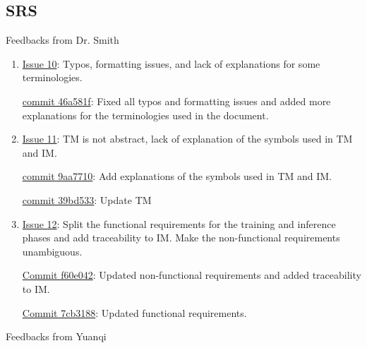 \documentclass{article}
\begin{document}
\subsection{SRS}
Feedbacks from Dr. Smith
\begin{enumerate}
    \item \href{https://github.com/V-AS/Two-tower-recommender-system/issues/10}{Issue 10}: Typos, formatting issues, and lack of explanations for some terminologies.  
    
    \href{https://github.com/V-AS/Two-tower-recommender-system/commit/46a581ffec8f09107f233065023d5e09764f8eb1}{commit 46a581f}: Fixed all typos and formatting issues and added more explanations for the terminologies used in the document. 
    
    \item \href{https://github.com/V-AS/Two-tower-recommender-system/issues/11}{Issue 11}: TM is not abstract, lack of explanation of the symbols used in TM and IM.
    
    \href{https://github.com/V-AS/Two-tower-recommender-system/commit/9aa7710e560448bddbc17a60377ccdd5e0e5989a}{commit 9aa7710}: Add explanations of the symbols used in TM and IM.

    \href{https://github.com/V-AS/Two-tower-recommender-system/commit/39bd533753ef0951fa4a5d411c8ae693e7f99ee7}{commit 39bd533}: Update TM 

    \item \href{https://github.com/V-AS/Two-tower-recommender-system/issues/12}{Issue 12}: Split the functional requirements for the training and inference phases and add traceability to IM.  
    Make the non-functional requirements unambiguous.  

    \href{https://github.com/V-AS/Two-tower-recommender-system/commit/f60e04293c87e0ce356bcfcb75288305ada5343f}{Commit f60e042}: Updated non-functional requirements and added traceability to IM.  

    \href{https://github.com/V-AS/Two-tower-recommender-system/commit/7cb31888f47dff465fedaf962dd89f10d9546b52}{Commit 7cb3188}: Updated functional requirements.  

\end{enumerate}
Feedbacks from Yuanqi
\end{document}
